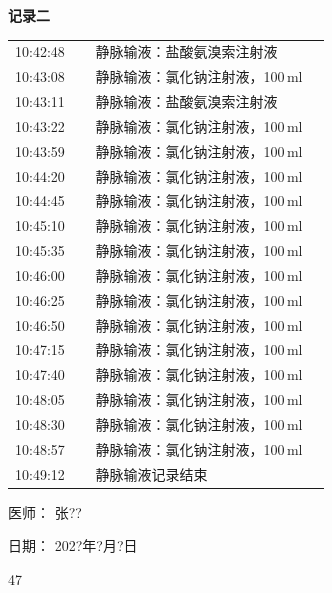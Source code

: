 \documentclass[UTF8,10pt,a4paper,fontset=fandol]{ctexart}
\newcommand{\fieldvalue}[1]{#1}
\newcommand{\handwritten}[1]{#1}
\begin{document}
\begin{minipage}[t]{0.47\linewidth}
\small
\textbf{记录二}\\[2pt]
\begin{tabular}{@{}p{0.24\linewidth}p{0.70\linewidth}@{}}
10:42:48 & 静脉输液：盐酸氨溴索注射液\\
10:43:08 & 静脉输液：氯化钠注射液，100\,ml\\
10:43:11 & 静脉输液：盐酸氨溴索注射液\\
10:43:22 & 静脉输液：氯化钠注射液，100\,ml\\
10:43:59 & 静脉输液：氯化钠注射液，100\,ml\\
10:44:20 & 静脉输液：氯化钠注射液，100\,ml\\
10:44:45 & 静脉输液：氯化钠注射液，100\,ml\\
10:45:10 & 静脉输液：氯化钠注射液，100\,ml\\
10:45:35 & 静脉输液：氯化钠注射液，100\,ml\\
10:46:00 & 静脉输液：氯化钠注射液，100\,ml\\
10:46:25 & 静脉输液：氯化钠注射液，100\,ml\\
10:46:50 & 静脉输液：氯化钠注射液，100\,ml\\
10:47:15 & 静脉输液：氯化钠注射液，100\,ml\\
10:47:40 & 静脉输液：氯化钠注射液，100\,ml\\
10:48:05 & 静脉输液：氯化钠注射液，100\,ml\\
10:48:30 & 静脉输液：氯化钠注射液，100\,ml\\
10:48:57 & 静脉输液：氯化钠注射液，100\,ml\\
10:49:12 & 静脉输液记录结束\\
\end{tabular}

\vfill

\noindent 医师：%
\fieldvalue{\handwritten{张??}}

\medskip

\noindent 日期：%
\fieldvalue{\handwritten{202?年?月?日}}

\medskip

\fieldvalue{\handwritten{47}}

\end{minipage}
\end{document}
